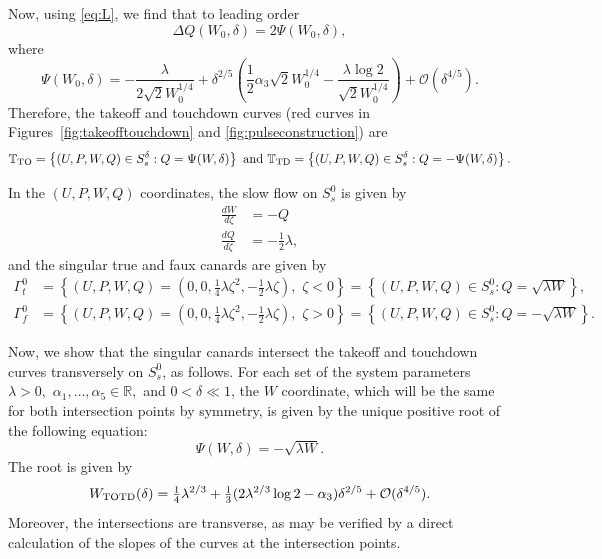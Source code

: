 \documentclass[11pt]{article}
\numberwithin{equation}{section}
\begin{document}
Now, using
\eqref{eq:L}, we find that 
to leading order 
\begin{equation}\label{eq:DeltaQ=2Psi}
\Delta Q (W_0,\delta)= 2 \Psi (W_0,\delta),
\end{equation}
where 
\begin{equation*}
\Psi(W_0,\delta) = -\frac{\lambda}{2\sqrt{2} W_0^{1/4} } 
+ \delta^{2/5} \left( \frac{1}{2} \alpha_3 \sqrt{2} W_0^{1/4} - \frac{\lambda \log 2}{\sqrt{2} W_0^{1/4} }\right) +\mathcal{O}(\delta^{4/5}).
\end{equation*}
Therefore, the takeoff and touchdown curves (red curves in Figures~\ref{fig:takeofftouchdown} and \ref{fig:pulseconstruction}) are
\begin{equation}\label{eq:TOTD}
\mathbb{T}_{\rm TO} = \left\{ (U,P,W,Q) \in S_s^\delta : Q=\Psi (W,\delta)\right\} \, \,  {\rm and} \, \, 
\mathbb{T}_{\rm TD} = \left\{  (U,P,W,Q) \in S_s^\delta : Q = - \Psi (W,\delta) \right\}.
\end{equation}



In the $(U,P,W,Q)$ coordinates, the slow flow on $S_s^0$ is given by
\begin{equation}
\begin{split}
\frac{dW}{d\zeta} &= - Q\\
\frac{dQ}{d\zeta} &= -\frac{1}{2} \lambda,
\end{split}
\end{equation}
and the singular true and faux canards are given by
\begin{equation}\label{eq:Gamma0-UPWQ}
\begin{split}
\Gamma_t^0 &= \left\{ (U,P,W,Q) =\left(0,0,\tfrac{1}{4}\lambda \zeta^2, -\tfrac{1}{2}\lambda \zeta\right), \, \, \zeta<0\right\} 
= \left\{ (U,P,W,Q) \in S_s^0 : Q = \sqrt{\lambda W} \right\}, 
\\
\Gamma_f^0 &= \left\{ (U,P,W,Q) =\left(0,0,\tfrac{1}{4}\lambda \zeta^2, -\tfrac{1}{2}\lambda \zeta\right), \, \, \zeta > 0\right\} 
= \left\{ (U,P,W,Q) \in S_s^0 : Q = - \sqrt{\lambda W} \right\}.
\end{split}
\end{equation}

Now, we show that the singular canards intersect the takeoff and touchdown curves transversely on $S_s^0$, as follows.
For each set of the system parameters $\lambda>0,$ $\alpha_1, \ldots, \alpha_5 \in \mathbb{R},$ and $0< \delta \ll 1$,
the $W$ coordinate, which will be the same for both intersection points by symmetry, is given by the unique positive root of the following equation:
\begin{equation}\label{eq:intersectionequation-4-W}
    \Psi(W,\delta) = -\sqrt{\lambda W}.
\end{equation}
The root is given by
\begin{equation}\label{eq:WTOTD}
W_{\rm TOTD} (\delta) = \tfrac{1}{4} \lambda^{2/3} + \tfrac{1}{3} ( 2 \lambda^{2/3} \log 2 - \alpha_3) \delta^{2/5} + \mathcal{O}(\delta^{4/5}).
\end{equation}
Moreover, the intersections are transverse, as may be verified by a direct calculation of the slopes of the curves at the intersection points.
\end{document}
